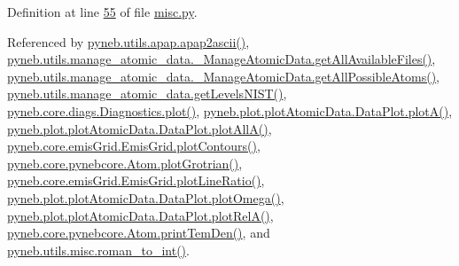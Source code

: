 Definition at line \hyperlink{misc_8py_source_l00055}{55} of file \hyperlink{misc_8py_source}{misc.\-py}.



Referenced by \hyperlink{apap_8py_source_l00078}{pyneb.\-utils.\-apap.\-apap2ascii()}, \hyperlink{manage__atomic__data_8py_source_l00190}{pyneb.\-utils.\-manage\-\_\-atomic\-\_\-data.\-\_\-\-Manage\-Atomic\-Data.\-get\-All\-Available\-Files()}, \hyperlink{manage__atomic__data_8py_source_l00242}{pyneb.\-utils.\-manage\-\_\-atomic\-\_\-data.\-\_\-\-Manage\-Atomic\-Data.\-get\-All\-Possible\-Atoms()}, \hyperlink{manage__atomic__data_8py_source_l00606}{pyneb.\-utils.\-manage\-\_\-atomic\-\_\-data.\-get\-Levels\-N\-I\-S\-T()}, \hyperlink{diags_8py_source_l00421}{pyneb.\-core.\-diags.\-Diagnostics.\-plot()}, \hyperlink{plot_atomic_data_8py_source_l00117}{pyneb.\-plot.\-plot\-Atomic\-Data.\-Data\-Plot.\-plot\-A()}, \hyperlink{plot_atomic_data_8py_source_l00189}{pyneb.\-plot.\-plot\-Atomic\-Data.\-Data\-Plot.\-plot\-All\-A()}, \hyperlink{emis_grid_8py_source_l00182}{pyneb.\-core.\-emis\-Grid.\-Emis\-Grid.\-plot\-Contours()}, \hyperlink{pynebcore_8py_source_l02443}{pyneb.\-core.\-pynebcore.\-Atom.\-plot\-Grotrian()}, \hyperlink{emis_grid_8py_source_l00241}{pyneb.\-core.\-emis\-Grid.\-Emis\-Grid.\-plot\-Line\-Ratio()}, \hyperlink{plot_atomic_data_8py_source_l00373}{pyneb.\-plot.\-plot\-Atomic\-Data.\-Data\-Plot.\-plot\-Omega()}, \hyperlink{plot_atomic_data_8py_source_l00262}{pyneb.\-plot.\-plot\-Atomic\-Data.\-Data\-Plot.\-plot\-Rel\-A()}, \hyperlink{pynebcore_8py_source_l02324}{pyneb.\-core.\-pynebcore.\-Atom.\-print\-Tem\-Den()}, and \hyperlink{misc_8py_source_l00095}{pyneb.\-utils.\-misc.\-roman\-\_\-to\-\_\-int()}.


